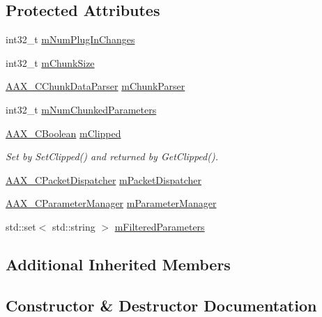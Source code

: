 \subsection*{Protected Attributes}
\begin{DoxyCompactItemize}
\item 
int32\+\_\+t \hyperlink{a00018_a1d9f79117c9075f47b00a7af34113b22}{m\+Num\+Plug\+In\+Changes}
\item 
int32\+\_\+t \hyperlink{a00018_a8c792ec58dc073534348004f0c0c09dd}{m\+Chunk\+Size}
\item 
\hyperlink{a00014}{A\+A\+X\+\_\+\+C\+Chunk\+Data\+Parser} \hyperlink{a00018_a71e52a24c8cd8853c768417aa181b41f}{m\+Chunk\+Parser}
\item 
int32\+\_\+t \hyperlink{a00018_ad6a57b4e98161c28b55b250e0234c4ba}{m\+Num\+Chunked\+Parameters}
\item 
\hyperlink{a00149_aa216506530f1d19a2965931ced2b274b}{A\+A\+X\+\_\+\+C\+Boolean} \hyperlink{a00018_ad1f88737300c7685cbd0dda4f65cdbb7}{m\+Clipped}
\begin{DoxyCompactList}\small\item\em Set by Set\+Clipped() and returned by Get\+Clipped(). \end{DoxyCompactList}\item 
\hyperlink{a00031}{A\+A\+X\+\_\+\+C\+Packet\+Dispatcher} \hyperlink{a00018_a1e4a92cdd947d35eb4382f0b5c4c8dae}{m\+Packet\+Dispatcher}
\item 
\hyperlink{a00034}{A\+A\+X\+\_\+\+C\+Parameter\+Manager} \hyperlink{a00018_afbb31a7a131b227ddd8bbd920aafbfb8}{m\+Parameter\+Manager}
\item 
std\+::set$<$ std\+::string $>$ \hyperlink{a00018_a353f5472e4eaefd348f20f9ff07a13a0}{m\+Filtered\+Parameters}
\end{DoxyCompactItemize}
\subsection*{Additional Inherited Members}


\subsection{Constructor \& Destructor Documentation}
\hypertarget{a00018_a35be0a247836ce95e3c6d04a3d756a9f}{}
